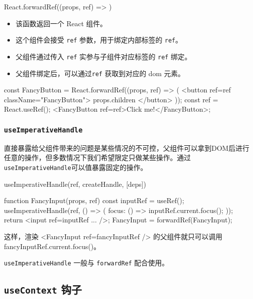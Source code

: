 \begin{JavaScript}
React.forwardRef((props, ref) => {}) 
\end{JavaScript}

\begin{itemize}
    \item 该函数返回一个 React 组件。
    \item 这个组件会接受 \texttt{ref} 参数，用于绑定内部标签的 \texttt{ref}。
    \item 父组件通过传入 \texttt{ref} 实参与子组件对应标签的 \texttt{ref} 绑定。
    \item 父组件绑定后，可以通过\texttt{ref} 获取到对应的 dom 元素。
\end{itemize}

\begin{JavaScript}
const FancyButton = React.forwardRef((props, ref) => (  
  <button ref={ref} className="FancyButton">    
    {props.children}
  </button>
));
const ref = React.useRef();
<FancyButton ref={ref}>Click me!</FancyButton>;
\end{JavaScript}

\subsubsection{\texttt{useImperativeHandle}}

直接暴露给父组件带来的问题是某些情况的不可控，父组件可以拿到DOM后进行任意的操作，但多数情况下我们希望限定只做某些操作。通过\texttt{useImperativeHandle}可以值暴露固定的操作。

\begin{JavaScript}
useImperativeHandle(ref, createHandle, [deps])
\end{JavaScript}

\begin{JavaScript}
function FancyInput(props, ref) {
  const inputRef = useRef();
  useImperativeHandle(ref, () => ({
    focus: () => {
      inputRef.current.focus();
    }
  }));
  return <input ref={inputRef} ... />;
}
FancyInput = forwardRef(FancyInput);
\end{JavaScript}

这样，渲染 <FancyInput ref={fancyInputRef} /> 的父组件就只可以调用 fancyInputRef.current.focus()。

\texttt{useImperativeHandle} 一般与 \texttt{forwardRef} 配合使用。

\subsection{\texttt{useContext} 钩子}

